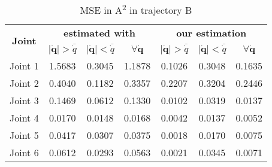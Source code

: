 \begin{table}
\centering
\caption{MSE in \si{\ampere\squared} in trajectory B}
\label{tab:comparison-traj-b}
\begin{tabular}{c|ccc|ccc}
\multirow{2}{*}{\textbf{Joint}} & \multicolumn{3}{c|}{\textbf{estimated with \cite{gaz_model-based_2018}}} & \multicolumn{3}{c}{\textbf{our estimation}} \\
 & $\lvert \dot{\bm q}\rvert > \overline{\dot q}$ & $\lvert \dot{\bm q}\rvert < \overline{\dot q}$ & $\forall \dot{\bm q}$ & $\lvert \dot{\bm q}\rvert > \overline{\dot q}$ & $\lvert \dot{\bm q}\rvert < \overline{\dot q}$ & $\forall \dot{\bm q}$ \\ 
\hline
Joint 1 & 1.5683 & 0.3045 & 1.1878 & 0.1026 & 0.3048 & 0.1635 \\
Joint 2 & 0.4040 & 0.1182 & 0.3357 & 0.2207 & 0.3204 & 0.2446 \\
Joint 3 & 0.1469 & 0.0612 & 0.1330 & 0.0102 & 0.0319 & 0.0137 \\
Joint 4 & 0.0170 & 0.0148 & 0.0168 & 0.0042 & 0.0137 & 0.0052 \\
Joint 5 & 0.0417 & 0.0307 & 0.0375 & 0.0018 & 0.0170 & 0.0075 \\
Joint 6 & 0.0612 & 0.0293 & 0.0563 & 0.0021 & 0.0345 & 0.0071
\end{tabular}
\end{table}